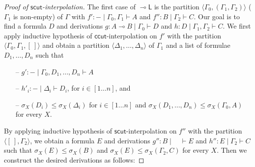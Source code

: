 \documentclass[sn-mathphys-num]{sn-jnl}%
\newcommand{\GG}{\Gamma}
\newcommand{\GD}{\Delta}
\newcommand{\vd}{\vdash}
\newcommand{\lolli}{\multimap}
\newcommand{\lleft}{{\lolli}\mathsf{L}}
\newcommand{\lright}{{\lolli}\mathsf{R}}
\newcommand{\mf}[1]{\mathsf{#1}}
\newcommand{\gs}[1]{\sigma_{X} (#1)}
\theoremstyle{thmstyleone}%
\theoremstyle{thmstyletwo}%
\theoremstyle{thmstylethree}%
\begin{document}
\begin{proof}[Proof of $\mf{scut}$-interpolation]
The first case of $\lleft$ is the partition $\langle \GG_0, (\GG_1, \GG_2) \rangle$ ($\GG_1$ is non-empty) of $\GG$ with $f' : {-} \mid \GG_0, \GG_1 \vd A$ and $f'': B \mid \GG_2 \vd C$.
Our goal is to find a formula $D$ and derivations $g : A\lolli B \mid \GG_0 \vd D$ and $h: D \mid \GG_1, \GG_2 \vd C$.
We first apply inductive hypothesis of $\mf{ccut}$-interpolation on $f'$ with the partition $\langle \GG_0 , \GG_1 , [\ ]\rangle$ and obtain a partition $\langle \GD_1, \dots , \GD_n \rangle$ of $\GG_1$ and a list of formulae $D_1 , \dots , D_n$ such that
\begin{itemize}
  \item[--] $g': {-} \mid \GG_0 , D_1, \dots, D_n \vd A$
  \item[--] $h'_i : {-} \mid \GD_i \vd D_i$, for $i \in [1\dots n]$, and 
  \item[--] $\gs{D_i} \leq \gs{\GD_i}$ for $i \in [1 \dots n]$ and $\gs{D_1 , \dots , D_n} \leq \gs{\GG_0 , A}$ for every $X$.
\end{itemize}
By applying inductive hypothesis of $\mf{scut}$-interpolation on $f''$ with the partition $\langle [\ ] , \GG_2 \rangle$, we obtain a formula $E$ and derivations $g'' : B \mid \quad \vd E$ and $h'': E \mid \GG_2 \vd C$ such that $\gs{E} \leq\gs{B}$ and $ \gs{E} \leq \gs{\GG_2 , C}$ for every $X$.
Then we construct the desired derivations as follows:

\end{proof}
\end{document}
